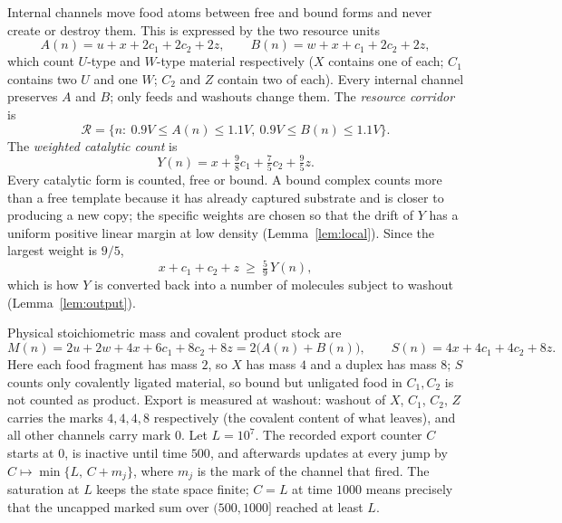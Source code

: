 \documentclass[11pt,a4paper]{article}
\theoremstyle{plain}
\theoremstyle{definition}
\theoremstyle{remark}
\newcommand{\R}{\mathcal R}
\begin{document}
Internal channels move food atoms between free and bound forms and never create or destroy them. This is expressed by the two resource units
\begin{equation}\label{eq:units}
A(n)=u+x+2c_1+2c_2+2z,\qquad B(n)=w+x+c_1+2c_2+2z,
\end{equation}
which count $U$-type and $W$-type material respectively ($X$ contains one of each; $C_1$ contains two $U$ and one $W$; $C_2$ and $Z$ contain two of each). Every internal channel preserves $A$ and $B$; only feeds and washouts change them. The \emph{resource corridor} is
\begin{equation}\label{eq:corridor}
\R=\{n:\ 0.9V\le A(n)\le1.1V,\ 0.9V\le B(n)\le 1.1V\}.
\end{equation}
The \emph{weighted catalytic count} is
\begin{equation}\label{eq:Y}
Y(n)=x+\tfrac98c_1+\tfrac75c_2+\tfrac95z .
\end{equation}
Every catalytic form is counted, free or bound. A bound complex counts more than a free template because it has already captured substrate and is closer to producing a new copy; the specific weights are chosen so that the drift of $Y$ has a uniform positive linear margin at low density (Lemma~\ref{lem:local}). Since the largest weight is $9/5$,
\begin{equation}\label{eq:count-vs-Y}
x+c_1+c_2+z\ \ge\ \tfrac59\,Y(n),
\end{equation}
which is how $Y$ is converted back into a number of molecules subject to washout (Lemma~\ref{lem:output}).

Physical stoichiometric mass and covalent product stock are
\begin{equation}\label{eq:stocks}
M(n)=2u+2w+4x+6c_1+8c_2+8z=2\bigl(A(n)+B(n)\bigr),\qquad S(n)=4x+4c_1+4c_2+8z .
\end{equation}
Here each food fragment has mass $2$, so $X$ has mass $4$ and a duplex has mass $8$; $S$ counts only covalently ligated material, so bound but unligated food in $C_1,C_2$ is not counted as product. Export is measured at washout: washout of $X$, $C_1$, $C_2$, $Z$ carries the marks $4,4,4,8$ respectively (the covalent content of what leaves), and all other channels carry mark $0$. Let $L=10^7$. The recorded export counter $C$ starts at $0$, is inactive until time $500$, and afterwards updates at every jump by $C\mapsto\min\{L,\,C+m_j\}$, where $m_j$ is the mark of the channel that fired. The saturation at $L$ keeps the state space finite; $C=L$ at time $1000$ means precisely that the uncapped marked sum over $(500,1000]$ reached at least $L$.
\end{document}
